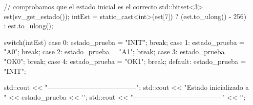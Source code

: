 \begin{mycode}[style=verilogstyle, caption={Banco de pruebas en C++ que se simula con Verilator.}, label=lst:mef-verilator]
{{{                // comprobamos que el estado inicial es el correcto 
                std::bitset<3> est(sv_get_estado());
                intEst = static_cast<int>(est[7]) ? (est.to_ulong() - 256) : est.to_ulong();
    
                switch(intEst){
                    case 0: estado_prueba = "INIT"; break;
                    case 1: estado_prueba = "A0"; break;
                    case 2: estado_prueba = "A1"; break;
                    case 3: estado_prueba = "OK0"; break;
                    case 4: estado_prueba = "OK1"; break;
                    default: estado_prueba = "INIT";
                }
    
                std::cout << "\n---------------------------------------\n";
                std::cout << "Estado inicializado a " << estado_prueba << '\n';
                std::cout << "---------------------------------------" << '\n';
    
}}}
\end{mycode}
